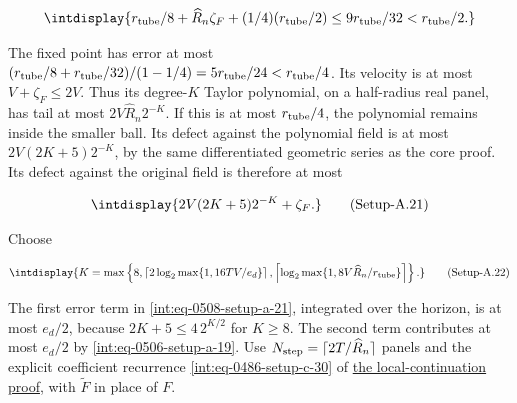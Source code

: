 \begingroup\renewcommand{\theHequation}{intdisplay.986}
\begin{equation*}
\intdisplay{
r_{\rm tube}/8+\widehat R_n\zeta_F+(1/4)(r_{\rm tube}/2)
\le9r_{\rm tube}/32<r_{\rm tube}/2.
}
\end{equation*}
\endgroup


The fixed point has error at most \((r_{\rm tube}/8+r_{\rm tube}/32)/(1-1/4)=5r_{\rm tube}/24<r_{\rm tube}/4\). Its velocity is at most \(V+\zeta_F\le2V\). Thus its degree-\(K\) Taylor polynomial, on a half-radius real panel, has tail at most \(2V\widehat R_n2^{-K}\). If this is at most \(r_{\rm tube}/4\), the polynomial remains inside the smaller ball. Its defect against the polynomial field is at most \(2V(2K+5)2^{-K}\), by the same differentiated geometric series as the core proof. Its defect against the original field is therefore at most


\label{int:eq-setup-a-21}
\begingroup\renewcommand{\theHequation}{intdisplay.987}
\begin{equation}
\intdisplay{
2V(2K+5)2^{-K}+\zeta_F.
}
\tag{Setup-A.21}
\label{int:eq-0508-setup-a-21}
\end{equation}
\endgroup


Choose


\label{int:eq-setup-a-22}
\begingroup\renewcommand{\theHequation}{intdisplay.988}
\begin{equation}
\intdisplay{
K=\max\left\{8,
\left\lceil2\log_2\max\{1,16TV/e_d\}\right\rceil,
\left\lceil\log_2\max\{1,8V\widehat R_n/r_{\rm tube}\}\right\rceil\right\}.
}
\tag{Setup-A.22}
\label{int:eq-0509-setup-a-22}
\end{equation}
\endgroup


The first error term in \hyperref[int:eq-setup-a-21]{\eqref{int:eq-0508-setup-a-21}}, integrated over the horizon, is at most \(e_d/2\), because \(2K+5\le4\,\allowbreak 2^{K/2}\) for \(K\ge8\). The second term contributes at most \(e_d/2\) by \hyperref[int:eq-setup-a-19]{\eqref{int:eq-0506-setup-a-19}}. Use \(N_{\rm step}=\lceil2T/\widehat R_n\rceil\) panels and the explicit coefficient recurrence \hyperref[int:eq-setup-c-30]{\eqref{int:eq-0486-setup-c-30}} of \hyperref[int:setup-core]{the local-continuation proof}, with \(\widetilde F\) in place of \(F\).


